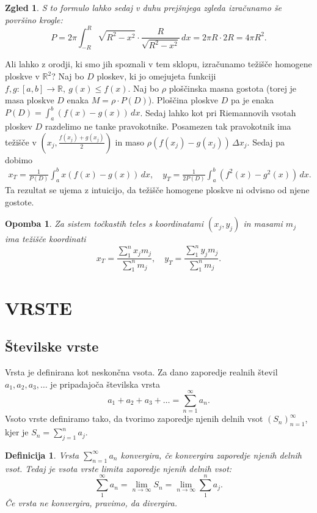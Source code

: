 \documentclass[10pt, a4paper]{article}
\newtheorem{defi}[izr]{Definicija}
\newenvironment{noticeB}{%
  \tcolorbox[%
  notitle,
  empty,
  enhanced,  %
  breakable,
  coltext=black,
  colback=white, 
  fontupper=\rmfamily,
  noparskip,
  sharp corners,
  boxrule=-1pt,  %
  frame hidden,
  left=7pt,  %
  right=7pt,
  top=5pt,
  bottom=5pt,
  before skip=2.5ex plus 2pt,
  after skip=2.5ex plus 2pt,
  borderline west = {1.5pt}{-0.1pt}{blue!30!black}, %
  overlay unbroken and last={%
    \draw[color=black, line width=1.25pt]
    ($(frame.south west)+(1.pt, -0.1pt)$) -- ++(2em, 0);
  }
  ]}
{\endtcolorbox}
\newenvironment{definicija}{\begin{noticeB}\begin{defi}}{%
\end{defi}\end{noticeB}}
\newtheorem*{opomba}{Opomba}
\newtheorem{zgled}[izr]{Zgled}
\newcommand{\R}{\mathbb {R}}
\newcommand{\limzap}[1]{\lim_{n \to \infty} {#1}}
\begin{document}
\begin{zgled}
    S to formulo lahko sedaj v duhu prejšnjega zgleda izračunamo še površino krogle:
    $$P = 2\pi \int_{-R} ^R  \sqrt{R^2 - x^2} \cdot \frac{R}{\sqrt{R^2 - x^2}}\,dx = 2\pi R \cdot 2R = 4 \pi R^2.$$
\end{zgled}

Ali lahko z orodji, ki smo jih spoznali v tem sklopu, izračunamo težišče homogene ploskve v $\R^2$?
Naj bo $D$ ploskev, ki jo omejujeta funkciji $f,g: [a, b] \rightarrow \R,\ g(x) \leq f(x)$.
Naj bo $\rho$ ploščinska masna gostota (torej je masa ploskve $D$ enaka $M = \rho \cdot P(D)$).
Ploščina ploskve $D$ pa je enaka $P(D) = \int_a ^b (f(x) - g(x))\,dx$.
Sedaj lahko kot pri Riemannovih vsotah ploskev $D$ razdelimo ne tanke pravokotnike. 
Posamezen tak pravokotnik ima težišče v $\left(x_j, \frac{f(x_j) + g(x_j)}{2} \right)$ in maso $\rho (f(x_j) - g(x_j))\,\Delta x_j$.
Sedaj pa dobimo
\begin{align*}
    x_T = \frac{1}{P(D)} \int_a ^b x(f(x) - g(x))\,dx, \quad y_T = \frac{1}{2P(D)} \int_a ^b (f^2(x) - g^2(x))\,dx.
\end{align*}
Ta rezultat se ujema z intuicijo, da težišče homogene ploskve ni odvisno od njene gostote.

\begin{opomba}
    Za sistem točkastih teles s koordinatami $(x_j, y_j)$ in masami $m_j$ ima težišče koordinati 
    $$x_T = \frac{\sum_1 ^n x_j m_j}{\sum_1 ^n m_j},\quad y_T = \frac{\sum_1 ^n y_j m_j}{\sum_1 ^n m_j}.$$
\end{opomba}

\clearpage
\section{VRSTE}

\subsection{Številske vrste}
Vrsta je definirana kot neskončna vsota.
Za dano zaporedje realnih števil $a_1, a_2, a_3, \ldots$ je pripadajoča številska vrsta 
$$a_1 + a_2 + a_3 + \dots = \sum_{n=1} ^\infty a_n.$$
Vsoto vrste definiramo tako, da tvorimo zaporedje njenih delnih vsot $(S_n)_{n=1} ^\infty$, kjer je $S_n = \sum_{j=1} ^n a_j$.

\begin{definicija}
    Vrsta $\sum_{n=1} ^\infty a_n$ konvergira, če konvergira zaporedje njenih delnih vsot. 
    Tedaj je vsota vrste limita zaporedje njenih delnih vsot:
    $$\sum_1 ^\infty a_n = \lim_{n \to \infty} S_n = \limzap{\sum_1 ^n a_j}.$$
    Če vrsta ne konvergira, pravimo, da divergira.
\end{definicija}
\end{document}
